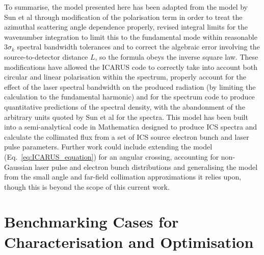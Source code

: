 \documentclass[../main.tex]{subfiles}
\begin{document}
To summarise, the model presented here has been adapted from the model by Sun et al \cite{sun2009characterizations,sun2011theoretical} through modification of the polarisation term in order to treat the azimuthal scattering angle dependence properly, revised integral limits for the wavenumber integration to limit this to the fundamental mode within reasonable $3\sigma_{k}$ spectral bandwidth tolerances and to correct the algebraic error involving the source-to-detector distance $L$, so the formula obeys the inverse square law. These modifications have allowed the \textsc{ICARUS} code to correctly take into account both circular and linear polarisation within the spectrum, properly account for the effect of the laser spectral bandwidth on the produced radiation (by limiting the calculation to the fundamental harmonic) and for the spectrum code to produce quantitative predictions of the spectral density, with the abandonment of the arbitrary units quoted by Sun et al \cite{sun2009characterizations,sun2011theoretical} for the spectra. This model has been built into a semi-analytical code in Mathematica designed to produce ICS spectra and calculate the collimated flux from a set of ICS source electron bunch and laser pulse parameters. Further work could include extending the model (Eq.~\ref{eq:ICARUS_equation}) for an angular crossing, accounting for non-Gaussian laser pulse and electron bunch distributions and generalising the model from the small angle and far-field collimation approximations it relies upon, though this is beyond the scope of this current work.

\section{Benchmarking Cases for Characterisation and Optimisation}
\label{sec:benchmarking_cases_characterisation_optimisation}
\end{document}
